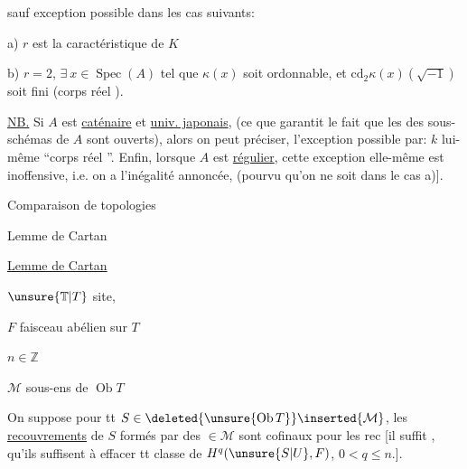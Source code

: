 sauf exception possible dans les cas suivants:

a) $r$ est la caractéristique de $K$

b) $r=2$, 
$\exists\ x\in\operatorname{Spec}(A)$ tel que $\kappa(x)$
soit ordonnable, et $\mathrm{cd}_2\kappa(x)(\sqrt{-1})$ soit fini
(corps réel ).

\uline{NB.} Si $A$ est \uline{caténaire} et \uline{univ. japonais},
(ce que garantit le fait que les 
des sous-schémas de $A$ sont ouverts), alors
 on peut préciser,  l'exception
possible par: $k$ lui-même ``corps réel ''.
Enfin, lorsque $A$ est \uline{régulier},
cette exception elle-même est inoffensive, i.e.
on a l'inégalité annoncée, (pourvu qu'on ne
soit dans le cas a)].

Comparaison de topologies \unsure{\ldots}

Lemme de Cartan

\uline{Lemme de Cartan}

$\unsure{\mathbb T|T}$  site, 

$F$ faisceau abélien sur $T$

$n\in\mathbb Z$


$\mathcal M$ sous-ens de $\operatorname{Ob}T$ 

On suppose 
pour tt $S\in\deleted{\unsure{\operatorname{Ob}T}}\inserted{\mathcal M}$, 
les \uline{recouvrements} de $S$ formés par des $\in\mathcal M$ sont
cofinaux pour les rec [il suffit \unsure{$=$}, qu'ils
suffisent à effacer  tt classe
de $H^q(\unsure{S|U},F)$, $0<q\leq n$.].

